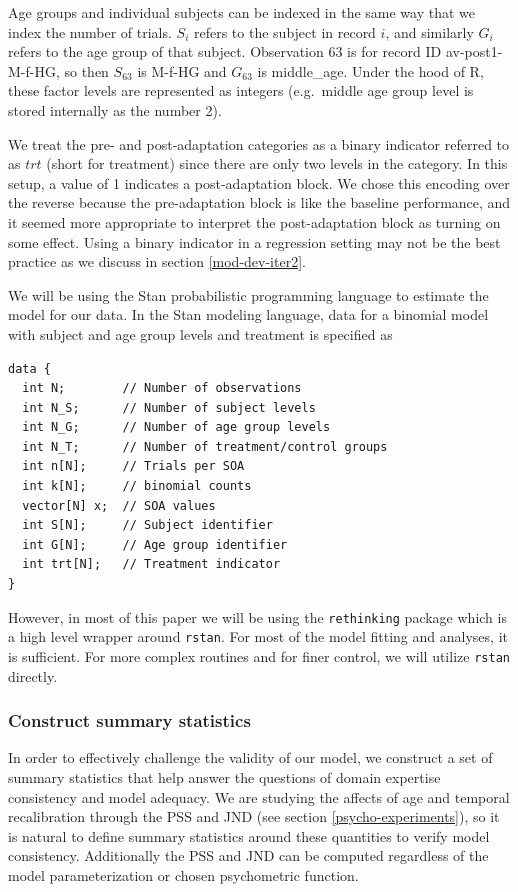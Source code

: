 \documentclass[11pt, oneside, openany]{scrbook}
\begin{document}
Age groups and individual subjects can be indexed in the same way that we index the number of trials. \(S_i\) refers to the subject in record \(i\), and similarly \(G_i\) refers to the age group of that subject. Observation 63 is for record ID av-post1-M-f-HG, so then \(S_{63}\) is M-f-HG and \(G_{63}\) is middle\_age. Under the hood of R, these factor levels are represented as integers (e.g.~middle age group level is stored internally as the number 2).

We treat the pre- and post-adaptation categories as a binary indicator referred to as \(trt\) (short for treatment) since there are only two levels in the category. In this setup, a value of 1 indicates a post-adaptation block. We chose this encoding over the reverse because the pre-adaptation block is like the baseline performance, and it seemed more appropriate to interpret the post-adaptation block as turning on some effect. Using a binary indicator in a regression setting may not be the best practice as we discuss in section \ref{mod-dev-iter2}.

We will be using the Stan probabilistic programming language to estimate the model for our data. In the Stan modeling language, data for a binomial model with subject and age group levels and treatment is specified as

\begin{verbatim}
data {
  int N;        // Number of observations
  int N_S;      // Number of subject levels
  int N_G;      // Number of age group levels
  int N_T;      // Number of treatment/control groups
  int n[N];     // Trials per SOA
  int k[N];     // binomial counts
  vector[N] x;  // SOA values
  int S[N];     // Subject identifier
  int G[N];     // Age group identifier
  int trt[N];   // Treatment indicator
}
\end{verbatim}

However, in most of this paper we will be using the \texttt{rethinking} package \citep{R-rethinking} which is a high level wrapper around \texttt{rstan}. For most of the model fitting and analyses, it is sufficient. For more complex routines and for finer control, we will utilize \texttt{rstan} directly.

\hypertarget{construct-summary-statistics}{%
\subsubsection{Construct summary statistics}\label{construct-summary-statistics}}

In order to effectively challenge the validity of our model, we construct a set of summary statistics that help answer the questions of domain expertise consistency and model adequacy. We are studying the affects of age and temporal recalibration through the PSS and JND (see section \ref{psycho-experiments}), so it is natural to define summary statistics around these quantities to verify model consistency. Additionally the PSS and JND can be computed regardless of the model parameterization or chosen psychometric function.
\end{document}
